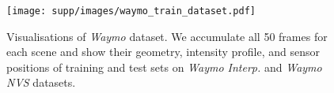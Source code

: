 \begin{figure}[t]
\centering
\texttt{[image: supp/images/waymo\_train\_dataset.pdf]}

\caption{Visualisations of \textit{Waymo} dataset. We accumulate all 50 frames for each scene and show their geometry, intensity profile, and sensor positions of training and test sets on \textit{Waymo Interp.} and \textit{Waymo NVS} datasets.}
\label{fig:iccv_supp_waymo_dataset}

\end{figure}